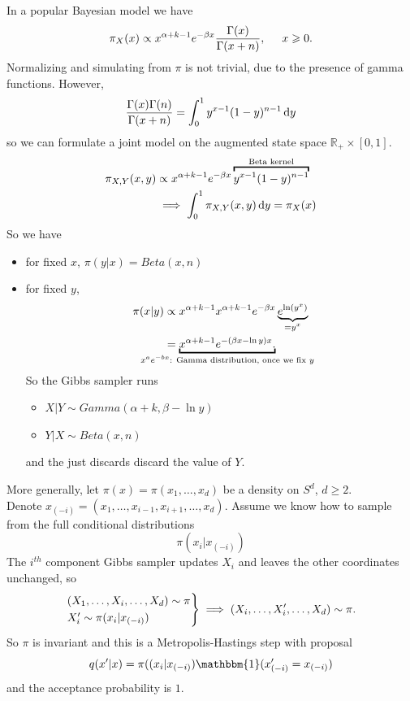 \documentclass{article}
\begin{document}
\begin{example}
    In a popular Bayesian model we have 
\begin{equation*}
    \pi_X (x) \propto x ^{\alpha+k-1} e ^{-\beta x} \frac{\Gamma(x)}{\Gamma(x+n)}, \hspace{0.5 cm } x \geqslant 0.
\end{equation*}
Normalizing and simulating from $\pi$ is not trivial, due to the presence of gamma functions. However, 
\begin{equation*}
    \frac{\Gamma(x)\Gamma(n)}{\Gamma(x+n)}=\int_0^1 y^{x-1}(1-y)^{n-1}\mathop{}\!\mathrm{d} y
\end{equation*}
so we can formulate a joint model on the augmented state space $\mathbb{R}_+ \times [0,1]$.
\begin{align*}
    \pi_{X,Y}(x,y)&\propto x ^{\alpha+k-1} e ^{-\beta x}\overbracket{y^{x-1}(1-y)^{n-1}}^{\text{Beta kernel}}\\
    &\implies\int_0^1 \pi_{X,Y}(x,y)\dif y=\pi_X(x)
\end{align*}
So we have 
\begin{itemize}
    \item for fixed $x$, $\pi(y|x)= Beta(x,n) $
    \item  for fixed $y$,
    \begin{align*}
        \pi (x|y) &\propto x ^{\alpha+k-1} x ^{\alpha+k-1} e ^{-\beta x} \underbrace{e ^{\ln(y^x)}}_{\mathclap{= y^x}}\\
        &= \underbracket{x ^{\alpha+k-1} e ^{-(\beta x -\ln y)x}.}_{\mathclap{x^ae^{-bx}\text{: Gamma distribution, once we fix }y}}
    \end{align*}
    So the Gibbs sampler runs 
    \begin{itemize}
        \item $X|Y \sim Gamma(\alpha+k, \beta- \ln y)$
        \item $Y|X \sim Beta(x,n)$
    \end{itemize}
    and the just discards discard the value of $Y$.
\end{itemize}
\end{example}
More generally, let $\pi (x)= \pi(x_1, \dots, x_d)$ be a density on $S^d$, $d \geqslant 2$. \\
Denote $x_{(-i)}=(x_1, \dots,x_{i-1}, x_{i+1}, \dots,  x_d) $. Assume we know how to sample from the full conditional distributions 
\begin{equation*}
    \pi(x_i |x_{(-i)})
\end{equation*}
The $i^{th}$ component Gibbs sampler updates $X_i$ and leaves the other coordinates unchanged, so 
\[
\begin{rcases*}
    (X_1,\ldots,X_i,\ldots,X_d)\sim\pi\\
    X_i'\sim\pi(x_i |x_{(-i)})
\end{rcases*}\implies (X_i,\ldots,X_i',\ldots,X_d)\sim\pi.
\]
So $\pi$ is invariant and this is a Metropolis-Hastings step with proposal 
\begin{equation*}
    q(x'|x) = \pi ((x_i |x_{(-i)}) \mathbbm{1}(x'_{(-i)}= x_{(-i)})
\end{equation*}
and the acceptance probability is $1$.
\end{document}
